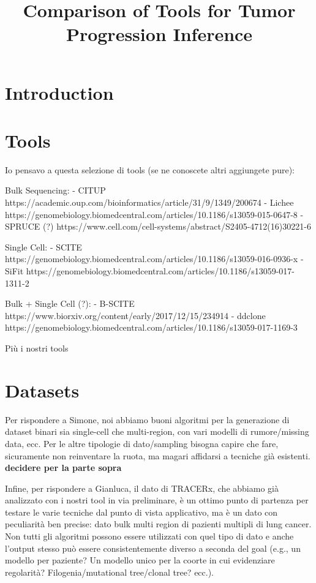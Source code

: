 \documentclass{article}
\title{Comparison of Tools for Tumor Progression Inference}
\author{}
\date{}
\begin{document}
\maketitle

\section{Introduction}

\section{Tools}
Io pensavo a questa selezione di tools (se ne conoscete altri aggiungete pure):

Bulk Sequencing:
- CITUP https://academic.oup.com/bioinformatics/article/31/9/1349/200674
- Lichee https://genomebiology.biomedcentral.com/articles/10.1186/s13059-015-0647-8
- SPRUCE (?) https://www.cell.com/cell-systems/abstract/S2405-4712(16)30221-6

Single Cell:
- SCITE https://genomebiology.biomedcentral.com/articles/10.1186/s13059-016-0936-x
- SiFit https://genomebiology.biomedcentral.com/articles/10.1186/s13059-017-1311-2

Bulk + Single Cell (?):
- B-SCITE https://www.biorxiv.org/content/early/2017/12/15/234914
- ddclone https://genomebiology.biomedcentral.com/articles/10.1186/s13059-017-1169-3

Più i nostri tools

\section{Datasets}

Per rispondere a Simone, noi abbiamo buoni algoritmi per la generazione di dataset binari sia single-cell che multi-region, con vari modelli di rumore/missing data, ecc. Per le altre tipologie di dato/sampling bisogna capire che fare, sicuramente non reinventare la ruota, ma magari affidarsi a tecniche già esistenti.
\textbf{decidere per la parte sopra}

Infine, per rispondere a Gianluca, il dato di TRACERx, che abbiamo già analizzato con i nostri tool in via preliminare, è un ottimo punto di partenza per testare le varie tecniche dal punto di vista applicativo, ma è un dato con peculiarità ben precise: dato bulk multi region di pazienti multipli di lung cancer. Non tutti gli algoritmi possono essere utilizzati con quel tipo di dato e anche l’output stesso può essere consistentemente diverso a seconda del goal (e.g., un modello per paziente? Un modello unico per la coorte in cui evidenziare regolarità? Filogenia/mutational tree/clonal tree? ecc.).
\end{document}
